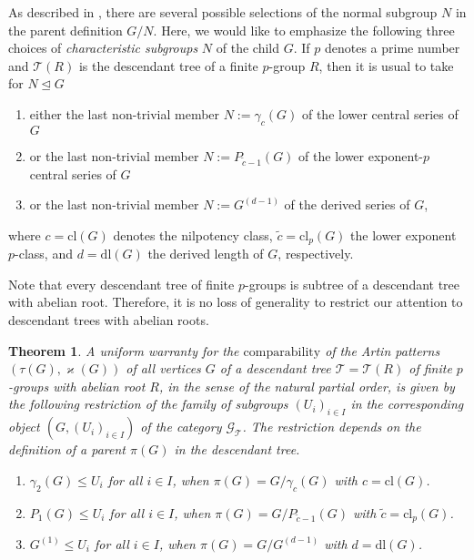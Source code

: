 \documentclass{amsart}
\newtheorem{theorem}{Theorem}[section]
\theoremstyle{definition}
\numberwithin{equation}{section}
\begin{document}
As described in
\cite{Ma5},
there are several possible selections of the normal subgroup \(N\) in the parent definition \(G/N\).
Here, we would like to emphasize the following three choices
of \textit{characteristic subgroups} \(N\) of the child \(G\).
If \(p\) denotes a prime number and \(\mathcal{T}(R)\) is the descendant tree of a finite \(p\)-group \(R\),
then it is usual to take for \(N\unlhd G\)

\begin{enumerate}

\item
either the last non-trivial member \(N:=\gamma_c(G)\) of the lower central series of \(G\)

\item
or the last non-trivial member \(N:=P_{\tilde{c}-1}(G)\) of the lower exponent-\(p\) central series of \(G\)

\item
or the last non-trivial member \(N:=G^{(d-1)}\) of the derived series of \(G\),

\end{enumerate}

\noindent
where \(c=\mathrm{cl}(G)\) denotes the nilpotency class,
\(\tilde{c}=\mathrm{cl}_p(G)\) the lower exponent \(p\)-class,
and \(d=\mathrm{dl}(G)\) the derived length of \(G\), respectively.

Note that every descendant tree of finite \(p\)-groups
is subtree of a descendant tree with abelian root.
Therefore, it is no loss of generality to restrict our attention
to descendant trees with abelian roots.

\begin{theorem}
\label{thm:Comparability}
A uniform warranty for the \(\mathrm{comparability}\)
of the Artin patterns \((\tau(G),\varkappa(G))\)
of all vertices \(G\) of a descendant tree \(\mathcal{T}=\mathcal{T}(R)\) of finite \(p\)-groups
with abelian root \(R\),
in the sense of the natural partial order,
is given by the following restriction
of the family of subgroups \((U_i)_{i\in I}\) in the corresponding object \((G,(U_i)_{i\in I})\)
of the category \(\mathcal{G}_{\mathcal{T}}\).
The restriction depends on the definition of a parent \(\pi(G)\) in the descendant tree.

\begin{enumerate}

\item
\(\gamma_2(G)\le U_i\) for all \(i\in I\), when \(\pi(G)=G/\gamma_c(G)\) with \(c=\mathrm{cl}(G)\).

\item
\(P_1(G)\le U_i\) for all \(i\in I\), when \(\pi(G)=G/P_{\tilde{c}-1}(G)\) with \(\tilde{c}=\mathrm{cl}_p(G)\).

\item
\(G^{(1)}\le U_i\) for all \(i\in I\), when \(\pi(G)=G/G^{(d-1)}\) with \(d=\mathrm{dl}(G)\).

\end{enumerate}

\end{theorem}
\end{document}
